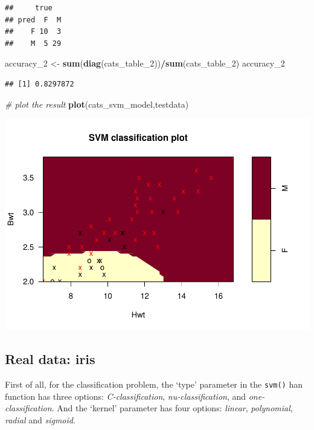 \documentclass[
]{article}
\newenvironment{Shaded}{\begin{snugshade}}{\end{snugshade}}
\newcommand{\CommentTok}[1]{\textcolor[rgb]{0.56,0.35,0.01}{\textit{#1}}}
\newcommand{\DecValTok}[1]{\textcolor[rgb]{0.00,0.00,0.81}{#1}}
\newcommand{\KeywordTok}[1]{\textcolor[rgb]{0.13,0.29,0.53}{\textbf{#1}}}
\newcommand{\NormalTok}[1]{#1}
\newcommand{\OperatorTok}[1]{\textcolor[rgb]{0.81,0.36,0.00}{\textbf{#1}}}
\newcommand{\StringTok}[1]{\textcolor[rgb]{0.31,0.60,0.02}{#1}}
\begin{document}
\begin{verbatim}
##     true
## pred  F  M
##    F 10  3
##    M  5 29
\end{verbatim}

\begin{Shaded}
\begin{Highlighting}[]
\NormalTok{accuracy_}\DecValTok{2}\NormalTok{ <-}\StringTok{ }\KeywordTok{sum}\NormalTok{(}\KeywordTok{diag}\NormalTok{(cats_table_}\DecValTok{2}\NormalTok{))}\OperatorTok{/}\KeywordTok{sum}\NormalTok{(cats_table_}\DecValTok{2}\NormalTok{)}
\NormalTok{accuracy_}\DecValTok{2}
\end{Highlighting}
\end{Shaded}

\begin{verbatim}
## [1] 0.8297872
\end{verbatim}

\begin{Shaded}
\begin{Highlighting}[]
\CommentTok{# plot the result}
\KeywordTok{plot}\NormalTok{(cats_svm_model,testdata)}
\end{Highlighting}
\end{Shaded}

\includegraphics{R4-SA8017026_files/figure-latex/unnamed-chunk-1-1.pdf}

\hypertarget{real-data-iris}{%
\subsection{Real data: iris}\label{real-data-iris}}

First of all, for the classification problem, the `type' parameter in
the \texttt{svm()} han function has three options:
\emph{C-classification}, \emph{nu-classification}, and
\emph{one-classification}. And the `kernel' parameter has four options:
\emph{linear}, \emph{polynomial}, \emph{radial} and \emph{sigmoid}.
\end{document}
